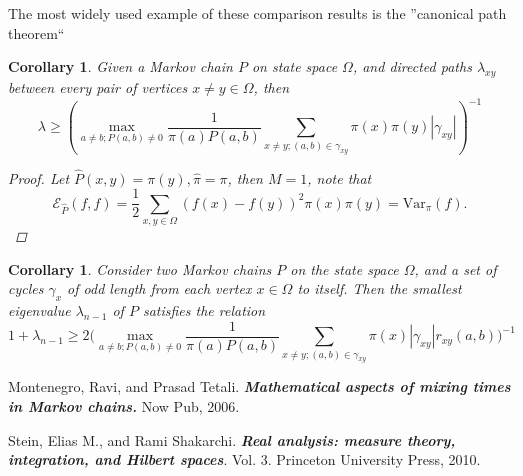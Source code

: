 \documentclass[12pt,reqno]{amsart}
\newtheorem{cor}[thm]{Corollary}
\begin{document}
The most widely used example of these comparison results is the ”canonical path theorem“
\begin{cor}
Given a Markov chain $P$ on state space $\Omega$, and directed paths $\lambda_{xy}$ between every pair of vertices $x\neq y \in \Omega$, then
$$
\lambda \geq (\max_{a \neq b;P(a,b)\neq 0}\frac{1}{\pi(a)P(a,b)}\sum_{x\neq y;(a,b)\in \gamma_{xy}}
\pi(x)\pi(y)|\gamma_{xy}|)^{-1}
$$
\begin{proof}
  Let $\hat{P}(x,y)=\pi(y), \hat{\pi}=\pi$, then $M=1$, note that
$$
\mathcal{E}_{\hat{P}}(f,f) = \frac{1}{2}\sum_{x,y\in \Omega}(f(x)-f(y))^2\pi(x)\pi(y)=\mbox{Var}_{\pi}(f).
$$
\end{proof}
\end{cor}

\begin{cor}
    Consider two Markov chains $P$ on the  state space $\Omega$, and a set of cycles $\gamma_x$ of odd length from each vertex $x\in \Omega$ to itself. Then the smallest eigenvalue $\lambda_{n-1}$ of $P$ satisfies the relation
$$
1+\lambda_{n-1} \geq 2\bigg (\max_{a \neq b;P(a,b)\neq 0}\frac{1}{\pi(a)P(a,b)}\sum_{x\neq y;(a,b)\in \gamma_{xy}}
\pi(x)|\gamma_{xy}|r_{xy}(a,b)\bigg)^{-1}
$$

\end{cor}


\begin{thebibliography}{99} %

Montenegro, Ravi, and Prasad Tetali. \textbf{\emph{Mathematical aspects of mixing times in Markov chains.}} Now Pub, 2006.

Stein, Elias M., and Rami Shakarchi. \textbf{\emph{Real analysis: measure theory, integration, and Hilbert spaces}}. Vol. 3. Princeton University Press, 2010.

\end{thebibliography}
\end{document}
